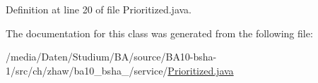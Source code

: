 Definition at line 20 of file Prioritized.java.

The documentation for this class was generated from the following file:\begin{DoxyCompactItemize}
\item 
/media/Daten/Studium/BA/source/BA10-\/bsha-\/1/src/ch/zhaw/ba10\_\-bsha\_/service/\hyperlink{Prioritized_8java}{Prioritized.java}\end{DoxyCompactItemize}
